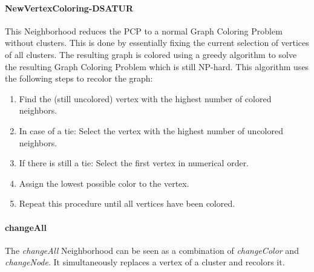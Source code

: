 \documentclass[paper=a4,fontsize=12pt]{scrartcl}
\begin{document}

\paragraph{NewVertexColoring-DSATUR}
This Neighborhood reduces the PCP to a normal Graph Coloring Problem without clusters. This is done by essentially fixing the current selection of vertices of all clusters. The resulting graph is colored using a greedy algorithm to solve the resulting Graph Coloring Problem which is still NP-hard. This algorithm uses the following steps to recolor the graph:


\begin{enumerate}
	 \item Find the (still uncolored) vertex with the highest number of colored neighbors.
	 \item In case of a tie: Select the vertex with the highest number of uncolored neighbors.
	 \item If there is still a tie: Select the first vertex in numerical order.
	 \item Assign the lowest possible color to the vertex.
	 \item Repeat this procedure until all vertices have been colored.
\end{enumerate}

\paragraph{changeAll}
The \emph{changeAll} Neighborhood can be seen as a combination of \emph{changeColor} and \emph{changeNode}. It simultaneously replaces a vertex of a cluster and recolors it.
\end{document}
